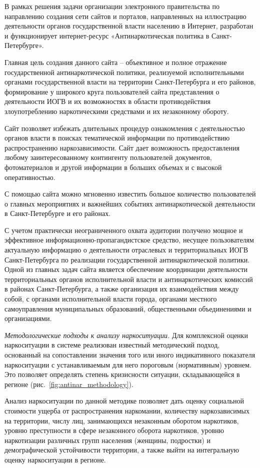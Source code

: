 В рамках решения задачи организации электронного правительства по направлению
создания сети сайтов и порталов, направленных на иллюстрацию деятельности
органов государственной власти населению в Интернет, разработан и функционирует
интернет-ресурс «Антинаркотическая политика в Санкт-Петербурге».

Главная цель создания данного сайта – объективное и полное отражение
государственной антинаркотической политики, реализуемой исполнительными органами
государственной власти на территории Санкт-Петербурга и его районов,
формирование у широкого круга пользователей сайта представления о деятельности
ИОГВ и их возможностях в области противодействия злоупотреблению наркотическими
средствами и их незаконному обороту.

Сайт позволяет избежать длительных процедур ознакомления с деятельностью органов
власти в поисках тематической информации по противодействию распространению
наркозависимости. Сайт дает возможность предоставления любому заинтересованному
контингенту пользователей документов, фотоматериалов и другой информации в
больших объемах и с высокой оперативностью. 

С помощью сайта можно мгновенно известить большое количество пользователей о
главных мероприятиях и важнейших событиях антинаркотической деятельности в
Санкт-Петербурге и его районах.

С учетом практически неограниченного охвата аудитории получено мощное и
эффективное информационно-пропагандистское средство, несущее пользователям
актуальную информацию о деятельности отраслевых и территориальных ИОГВ
Санкт-Петербурга по реализации государственной антинаркотической политики. 
Одной из главных задач сайта является обеспечение координации деятельности
территориальных органов исполнительной власти и антинаркотических комиссий в
районах Санкт-Петербурга, а также организация их взаимодействия между собой, с
органами исполнительной власти города, органами местного самоуправления
муниципальных образований, общественными объединениями и организациями.

\textit{Методологические подходы к анализу наркоситуации.}
Для комплексной оценки наркоситуации в системе реализован известный методический
подход, основанный на сопоставлении значения того или иного индикативного
показателя наркоситуации с устанавливаемым для него пороговым (нормативным)
уровнем. Это позволяет определять степень кризисности ситуации, складывающейся в
регионе (рис.~\ref{fig:antinar_methodology}). 

Анализ наркоситуации по данной методике позволяет дать оценку социальной
стоимости ущерба от распространения наркомании, количеству наркозависимых на
территории, числу лиц, занимающихся незаконным оборотом наркотиков, уровню
преступности в сфере незаконного оборота наркотиков, уровню наркотизации
различных групп населения (женщины, подростки) и демографической устойчивости
территории, а также выйти на интегральную оценку наркоситуации в регионе. 

